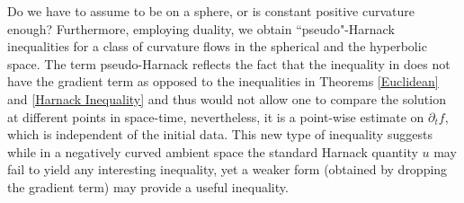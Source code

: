 {\color{red} Do we have to assume to be on a sphere, or is constant positive curvature enough?}
Furthermore, employing  duality, we obtain ``pseudo"-Harnack inequalities for a class of curvature flows in the spherical and the hyperbolic space.
The term pseudo-Harnack reflects the fact that the inequality in  does not have the gradient term as opposed to the inequalities in Theorems \ref{Euclidean} and \ref{Harnack Inequality} and thus would not allow one to compare the solution at different points in space-time, nevertheless, it is a point-wise estimate on $\partial_tf$, which is independent of the initial data. This new type of inequality suggests while in a negatively curved ambient space the standard Harnack quantity $u$ may fail to yield any interesting inequality, yet a weaker form (obtained by dropping the gradient term) may provide a useful inequality.

